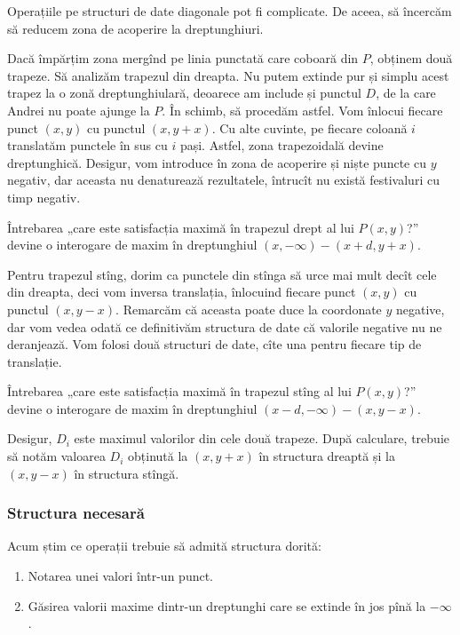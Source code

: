 Operațiile pe structuri de date diagonale pot fi complicate. De aceea, să încercăm să reducem zona de acoperire la dreptunghiuri.

Dacă împărțim zona mergînd pe linia punctată care coboară din $P$, obținem două trapeze. Să analizăm trapezul din dreapta. Nu putem extinde pur și simplu acest trapez la o zonă dreptunghiulară, deoarece am include și punctul $D$, de la care Andrei nu poate ajunge la $P$. În schimb, să procedăm astfel. Vom înlocui fiecare punct $(x, y)$ cu punctul $(x, y + x)$. Cu alte cuvinte, pe fiecare coloană $i$ translatăm punctele în sus cu $i$ pași. Astfel, zona trapezoidală devine dreptunghică. Desigur, vom introduce în zona de acoperire și niște puncte cu $y$ negativ, dar aceasta nu denaturează rezultatele, întrucît nu există festivaluri cu timp negativ.

Întrebarea „care este satisfacția maximă în trapezul drept al lui $P(x, y)$?” devine o interogare de maxim în dreptunghiul $(x, -\infty) - (x + d, y + x)$.

Pentru trapezul stîng, dorim ca punctele din stînga să urce mai mult decît cele din dreapta, deci vom inversa translația, înlocuind fiecare punct $(x, y)$ cu punctul $(x, y - x)$. Remarcăm că aceasta poate duce la coordonate $y$ negative, dar vom vedea odată ce definitivăm structura de date că valorile negative nu ne deranjează. Vom folosi două structuri de date, cîte una pentru fiecare tip de translație.

Întrebarea „care este satisfacția maximă în trapezul stîng al lui $P(x, y)$?” devine o interogare de maxim în dreptunghiul $(x - d, -\infty) - (x, y - x)$.

Desigur, $D_i$ este maximul valorilor din cele două trapeze. După calculare, trebuie să notăm valoarea $D_i$ obținută la $(x, y + x)$ în structura dreaptă și la $(x, y - x)$ în structura stîngă.

\subsubsection*{Structura necesară}

Acum știm ce operații trebuie să admită structura dorită:

\begin{enumerate}
  \item Notarea unei valori într-un punct.
  \item Găsirea valorii maxime dintr-un dreptunghi care se extinde în jos pînă la $-\infty$.
\end{enumerate}


